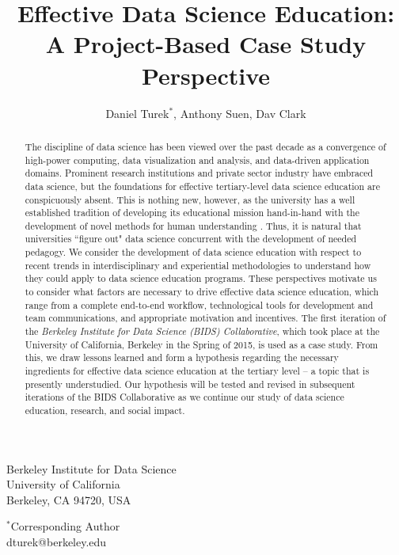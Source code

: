 \documentclass[12pt]{article}
\begin{document}
\title{Effective Data Science Education: \\
\large A Project-Based Case Study Perspective}

\author{Daniel Turek$^{*}$, Anthony Suen, Dav Clark}

\date{}

\maketitle

\vspace{0.4in}
\begin{center}

Berkeley Institute for Data Science \\
University of California \\
Berkeley, CA 94720, USA

\vspace{0.8in}

$^*$Corresponding Author \\
dturek@berkeley.edu
\end{center}

\thispagestyle{empty}
\newpage

\begin{abstract}
The discipline of data science has been viewed over the past decade as a convergence of high-power computing, data visualization and analysis, and data-driven application domains.  Prominent research institutions and private sector industry have embraced data science, but the foundations for effective tertiary-level data science education are conspicuously absent. This is nothing new, however, as the university has a well established tradition of developing its educational mission hand-in-hand with the development of novel methods for human understanding \citep{feingold_tradition_1991}. Thus, it is natural that universities ``figure out" data science concurrent with the development of needed pedagogy. We consider the development of data science education with respect to recent trends in interdisciplinary and experiential methodologies to understand how they could apply to data science education programs. These perspectives motivate us to consider what factors are necessary to drive effective data science education, which range from a complete end-to-end workflow, technological tools for development and team communications, and appropriate motivation and incentives. The first iteration of the \emph{Berkeley Institute for Data Science (BIDS) Collaborative}, which took place at the University of California, Berkeley in the Spring of 2015, is used as a case study. From this, we draw lessons learned and form a hypothesis regarding the necessary ingredients for effective data science education at the tertiary level -- a topic that is presently understudied.  Our hypothesis will be tested and revised in subsequent iterations of the BIDS Collaborative as we continue our study of data science education, research, and social impact.
\end{abstract}
\end{document}
